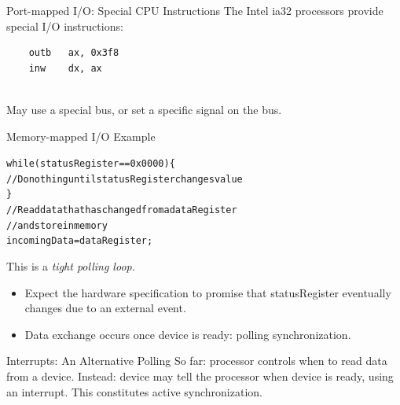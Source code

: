 \documentclass[aspectratio=169]{beamer}
\begin{document}
\begin{frame}[fragile]{Port-mapped I/O: Special CPU Instructions}
The Intel ia32 processors provide special I/O instructions:\\[1em]
\begin{verbatim}
    outb   ax, 0x3f8
    inw    dx, ax
\end{verbatim}
~\\
May use a special bus, or set a specific signal on the bus.
\end{frame}



\begin{frame}{Memory-mapped I/O Example}
{
\small
\begin{alltt}
 while (\alert{statusRegister} == 0x0000) \{\\
 \qquad // Do nothing until statusRegister changes value\\
 \}\\
 
 //  Read data that has changed from a dataRegister\\
 //  and store in memory\\
 incomingData = \alert{dataRegister};\\
\end{alltt}
}
{
\vspace{1em}
This is a \emph{tight polling loop}.
\begin{itemize}
\item Expect the hardware specification to promise that statusRegister eventually changes 
due to an external event.
\item Data exchange occurs once device is ready: \alert{polling synchronization}.
\end{itemize}
}
\end{frame}



\begin{frame}{Interrupts: An Alternative Polling}
\large
So far: processor controls when to read data from a device.\vfill
Instead: device may tell the processor when device is ready,
using an \alert{interrupt}.\vfill
This constitutes \alert{active synchronization}.
\end{frame}
\end{document}
